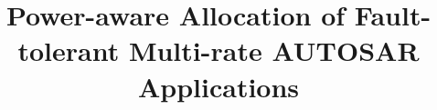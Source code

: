 \documentclass[conference]{IEEEtran}
\begin{document}
\title{Power-aware Allocation of Fault-tolerant Multi-rate AUTOSAR Applications}

%
%

\maketitle



%











% 
% 
\end{document}
